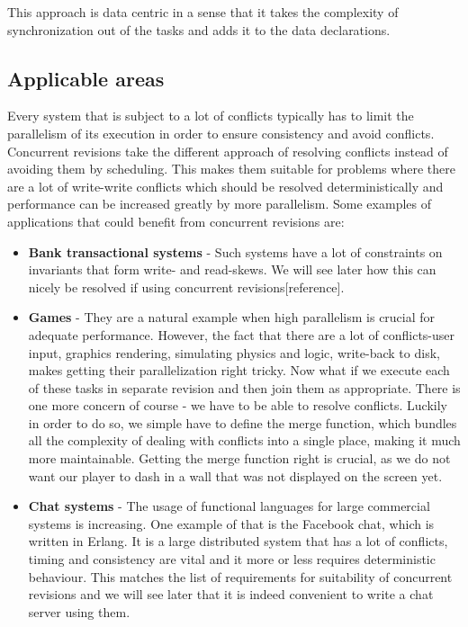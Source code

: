 \documentclass[12pt,twoside,notitlepage]{report}
\begin{document}
This approach is data centric in a sense that it takes the complexity of synchronization out of the tasks and adds it to the data declarations.  

\subsection{Applicable areas}
Every system that is subject to a lot of conflicts typically has to limit the parallelism of its execution in order to ensure consistency and avoid conflicts. Concurrent revisions take the different approach of resolving conflicts instead of avoiding them by scheduling. This makes them suitable for problems where there are a lot of write-write conflicts which should be resolved deterministically and performance can be increased greatly by more parallelism. Some examples of applications that could benefit from concurrent revisions are: 

\begin{itemize}


\item
{\bfseries Bank transactional systems} - Such systems have a lot of constraints on invariants that form write- and read-skews. We will see later how this can nicely be resolved if using concurrent revisions[reference].

\item
{\bfseries Games} - They are a natural example when high parallelism is crucial for adequate performance. However, the fact that there are a lot of conflicts-user input, graphics rendering, simulating physics and logic, write-back to disk, makes getting their parallelization right tricky. Now what if we execute each of these tasks in separate revision and then join them as appropriate. There is one more concern of course - we have to be able to resolve conflicts. Luckily in order to do so, we simple have to define the merge function, which bundles all the complexity of dealing with conflicts into a single place, making it much more maintainable. Getting the merge function right is crucial, as we do not want our player to dash in a wall that was not displayed on the screen yet.

\item
{\bfseries Chat systems} - The usage of functional languages for large commercial systems is increasing. One example of that is the Facebook chat, which is written in Erlang. It is a large distributed system that has a lot of conflicts, timing and consistency are vital and it more or less requires 
deterministic behaviour. This matches the list of requirements for suitability of concurrent revisions and we will see later that it is indeed convenient to write a chat server using them.

\end{itemize}
\end{document}
